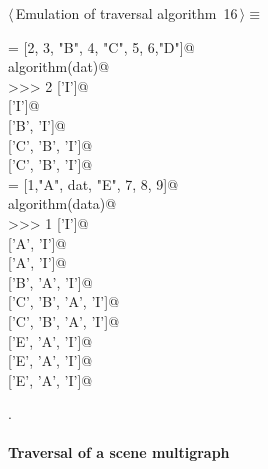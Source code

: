 \documentclass[11pt,oneside]{article}	%
\begin{document}
\begin{flushleft} \small \label{scrap30}
\protect{}$\langle\,$Emulation of traversal algorithm\nobreak\ {\footnotesize 16}$\,\rangle\equiv$
\vspace{-1ex}
\begin{list}{}{} \item
\mbox{}\verb@dat = [2, 3, "B", 4, "C", 5, 6,"D"]@\\
\mbox{}\verb@print algorithm(dat)@\\
\mbox{}\verb@>>> 2 ['I']@\\
\mbox{} ['I']@\\
\mbox{} ['B', 'I']@\\
\mbox{} ['C', 'B', 'I']@\\
\mbox{} ['C', 'B', 'I']@\\
\mbox{}\verb@data = [1,"A", dat, "E", 7, 8, 9]@\\
\mbox{}\verb@print algorithm(data)@\\
\mbox{}\verb@>>> 1 ['I']@\\
\mbox{} ['A', 'I']@\\
\mbox{} ['A', 'I']@\\
\mbox{} ['B', 'A', 'I']@\\
\mbox{} ['C', 'B', 'A', 'I']@\\
\mbox{} ['C', 'B', 'A', 'I']@\\
\mbox{} ['E', 'A', 'I']@\\
\mbox{} ['E', 'A', 'I']@\\
\mbox{} ['E', 'A', 'I']@\\
\mbox{}\verb@@{\NWsep}
\end{list}
\vspace{-1ex}
\footnotesize\addtolength{\baselineskip}{-1ex}
\begin{list}{}{\setlength{\itemsep}{-\parsep}\setlength{\itemindent}{-\leftmargin}}
\item {\NWtxtMacroNoRef}.
\end{list}
\end{flushleft}

\paragraph{Traversal of a scene multigraph}
\end{document}
